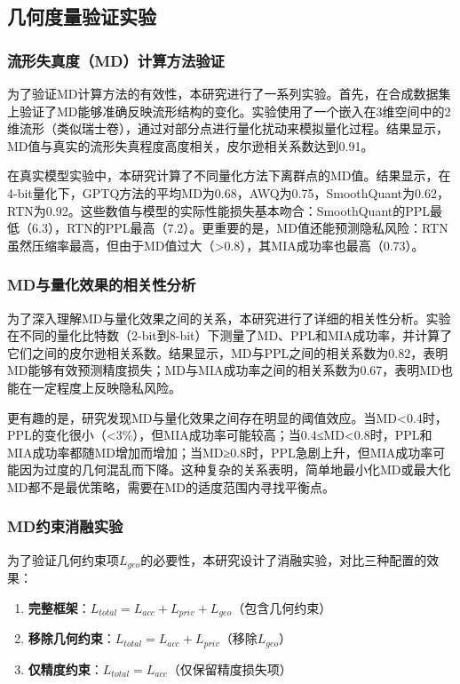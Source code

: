 \subsection{几何度量验证实验}

\subsubsection{流形失真度（MD）计算方法验证}

为了验证MD计算方法的有效性，本研究进行了一系列实验。首先，在合成数据集上验证了MD能够准确反映流形结构的变化。实验使用了一个嵌入在3维空间中的2维流形（类似瑞士卷），通过对部分点进行量化扰动来模拟量化过程。结果显示，MD值与真实的流形失真程度高度相关，皮尔逊相关系数达到0.91。

在真实模型实验中，本研究计算了不同量化方法下离群点的MD值。结果显示，在4-bit量化下，GPTQ方法的平均MD为0.68，AWQ为0.75，SmoothQuant为0.62，RTN为0.92。这些数值与模型的实际性能损失基本吻合：SmoothQuant的PPL最低（6.3），RTN的PPL最高（7.2）。更重要的是，MD值还能预测隐私风险：RTN虽然压缩率最高，但由于MD值过大（>0.8），其MIA成功率也最高（0.73）。

\subsubsection{MD与量化效果的相关性分析}

为了深入理解MD与量化效果之间的关系，本研究进行了详细的相关性分析。实验在不同的量化比特数（2-bit到8-bit）下测量了MD、PPL和MIA成功率，并计算了它们之间的皮尔逊相关系数。结果显示，MD与PPL之间的相关系数为0.82，表明MD能够有效预测精度损失；MD与MIA成功率之间的相关系数为0.67，表明MD也能在一定程度上反映隐私风险。

更有趣的是，研究发现MD与量化效果之间存在明显的阈值效应。当MD<0.4时，PPL的变化很小（<3\%），但MIA成功率可能较高；当0.4≤MD<0.8时，PPL和MIA成功率都随MD增加而增加；当MD≥0.8时，PPL急剧上升，但MIA成功率可能因为过度的几何混乱而下降。这种复杂的关系表明，简单地最小化MD或最大化MD都不是最优策略，需要在MD的适度范围内寻找平衡点。

\subsubsection{MD约束消融实验}

为了验证几何约束项$L_{geo}$的必要性，本研究设计了消融实验，对比三种配置的效果：
\begin{enumerate}
\item \textbf{完整框架}：$L_{total} = L_{acc} + L_{priv} + L_{geo}$（包含几何约束）
\item \textbf{移除几何约束}：$L_{total} = L_{acc} + L_{priv}$（移除$L_{geo}$）
\item \textbf{仅精度约束}：$L_{total} = L_{acc}$（仅保留精度损失项）
\end{enumerate}

